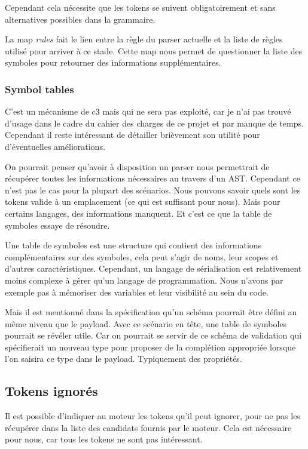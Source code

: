 \documentclass[
    iict, %
    il, %
]{heig-tb}
\begin{document}
Cependant cela nécessite que les tokens se suivent obligatoirement et sans alternatives possibles dans la grammaire.

La map \emph{rules} fait le lien entre la règle du parser actuelle et la liste de règles utilisé pour arriver à ce stade.
Cette map nous permet de questionner la liste des symboles pour retourner des informations supplémentaires.

\subsubsection{Symbol tables}\label{Symbol tables}

C'est un mécanisme de c3 mais qui ne sera pas exploité, car je n'ai pas trouvé d'usage dans le cadre du cahier des charges de ce projet et par manque de temps.
Cependant il reste intéressant de détailler brièvement son utilité pour d'éventuelles améliorations.

On pourrait penser qu'avoir à disposition un parser nous permettrait de récupérer toutes les informations nécessaires au travers d'un AST.
Cependant ce n'est pas le cas pour la plupart des scénarios.
Nous pouvons savoir quels sont les tokens valide à un emplacement (ce qui est suffisant pour nous). Mais pour certains langages, des informations manquent.
Et c'est ce que la table de symboles essaye de résoudre.

Une table de symboles est une structure qui contient des informations complémentaires sur des symboles, cela peut s'agir de noms, leur scopes et d'autres caractéristiques.
Cependant, un langage de sérialisation est relativement moins complexe à gérer qu'un langage de programmation.
Nous n'avons par exemple pas à mémoriser des variables et leur visibilité au sein du code.

Mais il est mentionné dans la spécification qu'un schéma pourrait être défini au même niveau que le payload.
Avec ce scénario en tête, une table de symboles pourrait se révéler utile. Car on pourrait se servir de ce schéma de validation qui spécifierait un nouveau type pour proposer de la complétion appropriée
lorsque l'on saisira ce type dans le payload. Typiquement des propriétés.

\subsection{Tokens ignorés}

Il est possible d'indiquer au moteur les tokens qu'il peut ignorer, pour ne pas les récupérer dans la liste des candidats fournis par le moteur.
Cela est nécessaire pour nous, car tous les tokens ne sont pas intéressant.
\end{document}
